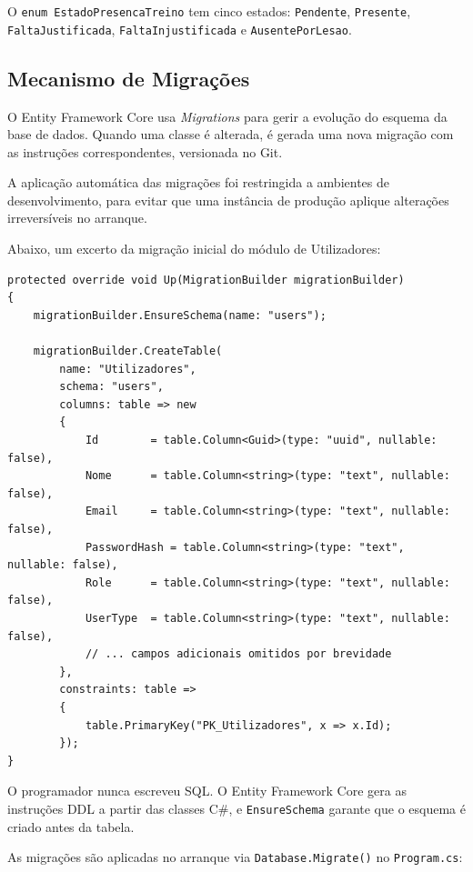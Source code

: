 O \texttt{enum EstadoPresencaTreino} tem cinco estados: \texttt{Pendente}, \texttt{Presente}, \texttt{FaltaJustificada}, \texttt{FaltaInjustificada} e \texttt{AusentePorLesao}.

\subsection{Mecanismo de Migrações}

O Entity Framework Core usa \textit{Migrations} para gerir a evolução do esquema da base de dados. Quando uma classe é alterada, é gerada uma nova migração com as instruções correspondentes, versionada no Git.

A aplicação automática das migrações foi restringida a ambientes de desenvolvimento, para evitar que uma instância de produção aplique alterações irreversíveis no arranque.

Abaixo, um excerto da migração inicial do módulo de Utilizadores:

\begin{lstlisting}[language={[Sharp]C},basicstyle=\ttfamily\small,breaklines=true,frame=single,caption={Excerto da migração \texttt{InitialUsers} --- criação da tabela \texttt{Utilizadores}.},label={lst:migration}]
protected override void Up(MigrationBuilder migrationBuilder)
{
    migrationBuilder.EnsureSchema(name: "users");

    migrationBuilder.CreateTable(
        name: "Utilizadores",
        schema: "users",
        columns: table => new
        {
            Id        = table.Column<Guid>(type: "uuid", nullable: false),
            Nome      = table.Column<string>(type: "text", nullable: false),
            Email     = table.Column<string>(type: "text", nullable: false),
            PasswordHash = table.Column<string>(type: "text", nullable: false),
            Role      = table.Column<string>(type: "text", nullable: false),
            UserType  = table.Column<string>(type: "text", nullable: false),
            // ... campos adicionais omitidos por brevidade
        },
        constraints: table =>
        {
            table.PrimaryKey("PK_Utilizadores", x => x.Id);
        });
}
\end{lstlisting}

O programador nunca escreveu SQL. O Entity Framework Core gera as instruções DDL a partir das classes C\#, e \texttt{EnsureSchema} garante que o esquema é criado antes da tabela.

As migrações são aplicadas no arranque via \texttt{Database.Migrate()} no \texttt{Program.cs}:

